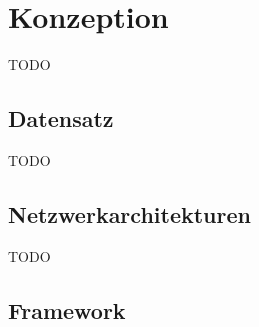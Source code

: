 \chapter{Konzeption}
TODO

\section{Datensatz}
TODO
\section{Netzwerkarchitekturen}
TODO
\section{Framework}